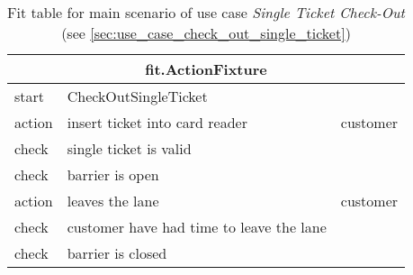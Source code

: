 
\begin{table}[H]
\begin{centering}
\begin{tabular}{|l|l|l|}
\hline 
\multicolumn{3}{|c|}{fit.ActionFixture}\tabularnewline
\hline 
start & CheckOutSingleTicket & \tabularnewline
\hline 
action & insert ticket into card reader & customer \tabularnewline
\hline 
check & single ticket is valid & \tabularnewline
\hline 
check & barrier is open & \tabularnewline
\hline 
action & leaves the lane & customer \tabularnewline
\hline 
check & customer have had time to leave the lane & \tabularnewline
\hline 
check & barrier is closed & \tabularnewline
\hline 
\end{tabular}
\par\end{centering}

\caption{Fit table for main scenario of use case \emph{Single Ticket Check-Out} (see \autoref{sec:use_case_check_out_single_ticket})}
\end{table}
